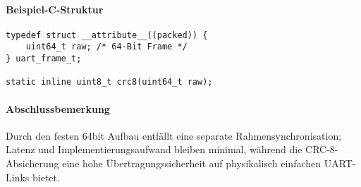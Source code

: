 \documentclass[main.tex]{subfiles} %
\begin{document}
\paragraph{Beispiel-C-Struktur}
\begin{verbatim}
typedef struct __attribute__((packed)) {
    uint64_t raw; /* 64-Bit Frame */
} uart_frame_t;

static inline uint8_t crc8(uint64_t raw);
\end{verbatim}

\paragraph{Abschlussbemerkung}
Durch den festen 64bit Aufbau entfällt eine separate
Rahmensynchronisation; Latenz und Implementierungsaufwand bleiben
minimal, während die CRC-8-Absicherung eine hohe
Übertragungssicherheit auf physikalisch einfachen UART-Links bietet.
\end{document}
